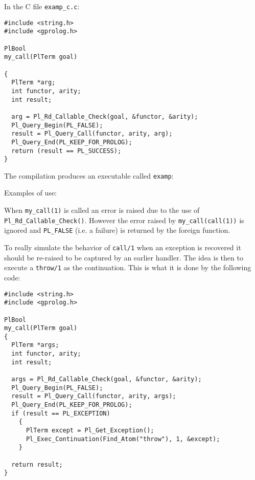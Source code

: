
In the C file \texttt{examp\_c.c}:

\begin{Indentation}
\begin{verbatim}
#include <string.h>
#include <gprolog.h>

PlBool
my_call(PlTerm goal)

{
  PlTerm *arg;
  int functor, arity;
  int result;

  arg = Pl_Rd_Callable_Check(goal, &functor, &arity);
  Pl_Query_Begin(PL_FALSE);
  result = Pl_Query_Call(functor, arity, arg);
  Pl_Query_End(PL_KEEP_FOR_PROLOG);
  return (result == PL_SUCCESS);
}
\end{verbatim}
\end{Indentation}

The compilation produces an executable called \texttt{examp}:


Examples of use:

\begin{CodeTwoCols}
\SkipLine
{}
\SkipLine
{}
\SkipLine
{}
\SkipLine
{}
\SkipLine
{}
\SkipLine
{}
\SkipLine
{}
\end{CodeTwoCols}

When \texttt{my\_call(1)} is called an error is raised due to the use of
\texttt{Pl\_Rd\_Callable\_Check()}. However the error raised by
\texttt{my\_call(call(1))} is ignored and \texttt{PL\_FALSE} (i.e. a failure) is
returned by the foreign function.

To really simulate the behavior of \texttt{call/1} when an exception
is recovered it should be re-raised to be captured by an earlier
handler. The idea is then to execute a \texttt{throw/1} as the
continuation. This is what it is done by the following code:

\begin{Indentation}
\begin{verbatim}
#include <string.h>
#include <gprolog.h>

PlBool
my_call(PlTerm goal)
{
  PlTerm *args;
  int functor, arity;
  int result;

  args = Pl_Rd_Callable_Check(goal, &functor, &arity);
  Pl_Query_Begin(PL_FALSE);
  result = Pl_Query_Call(functor, arity, args);
  Pl_Query_End(PL_KEEP_FOR_PROLOG);
  if (result == PL_EXCEPTION)
    {
      PlTerm except = Pl_Get_Exception();
      Pl_Exec_Continuation(Find_Atom("throw"), 1, &except);
    }

  return result;
}
\end{verbatim}
\end{Indentation}

